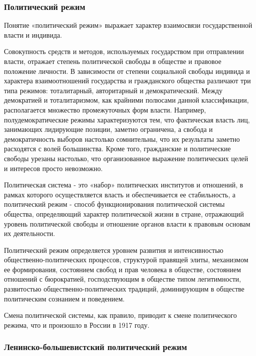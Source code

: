 \documentclass{article}
\begin{document}
\subsubsection{Политический режим}

Понятие «политический режим» выражает характер взаимосвязи государственной власти и индивида.

\hfill

Совокупность средств и методов, используемых государством при отправлении власти, отражает степень политической свободы в обществе и правовое положение личности. В зависимости от степени социальной свободы индивида и характера взаимоотношений государства и гражданского общества различают три типа режимов: тоталитарный, авторитарный и демократический. Между демократией и тоталитаризмом, как крайними полюсами данной классификации, располагается множество промежуточных форм власти. Например, полудемократические режимы характеризуются тем, что фактическая власть лиц, занимающих лидирующие позиции, заметно ограничена, а свобода и демократичность выборов настолько сомнительны, что их результаты заметно расходятся с волей большинства. Кроме того, гражданские и политические свободы урезаны настолько, что организованное выражение политических целей и интересов просто невозможно.

\hfill

Политическая система - это «набор» политических институтов и отношений, в рамках которого осуществляется власть и обеспечивается ее стабильность, а политический режим - способ функционирования политической системы общества, определяющий характер политической жизни в стране, отражающий уровень политической свободы и отношение органов власти к правовым основам их деятельности.

\hfill

Политический режим определяется уровнем развития и интенсивностью общественно-политических процессов, структурой правящей элиты, механизмом ее формирования, состоянием свобод и прав человека в обществе, состоянием отношений с бюрократией, господствующим в обществе типом легитимности, развитостью общественно-политических традиций, доминирующим в обществе политическим сознанием и поведением.

\hfill

Смена политической системы, как правило, приводит к смене политического режима, что и произошло в России в 1917 году.

\subsubsection{Ленинско-большевистский политический режим}
\end{document}
